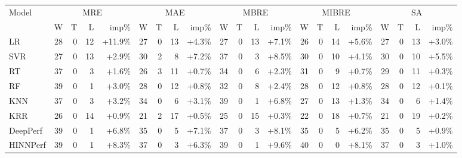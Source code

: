 \begin{tabular}{lrrrrrrrrrrrrrrrrrrrr}
\toprule
Model & \multicolumn{4}{c}{MRE} & \multicolumn{4}{c}{MAE} & \multicolumn{4}{c}{MBRE} & \multicolumn{4}{c}{MIBRE} & \multicolumn{4}{c}{SA} \\
& W & T & L & imp\% & W & T & L & imp\% & W & T & L & imp\% & W & T & L & imp\% & W & T & L & imp\% \\
\midrule
LR & 28 & 0 & 12 & +11.9\% & 27 & 0 & 13 & +4.3\% & 27 & 0 & 13 & +7.1\% & 26 & 0 & 14 & +5.6\% & 27 & 0 & 13 & +3.0\% \\
SVR & 27 & 0 & 13 & +2.9\% & 30 & 2 & 8 & +7.2\% & 37 & 0 & 3 & +8.5\% & 30 & 0 & 10 & +4.1\% & 30 & 0 & 10 & +5.5\% \\
RT & 37 & 0 & 3 & +1.6\% & 26 & 3 & 11 & +0.7\% & 34 & 0 & 6 & +2.3\% & 31 & 0 & 9 & +0.7\% & 29 & 0 & 11 & +0.3\% \\
RF & 39 & 0 & 1 & +3.0\% & 28 & 0 & 12 & +0.8\% & 32 & 0 & 8 & +2.4\% & 28 & 0 & 12 & +0.8\% & 28 & 0 & 12 & +0.1\% \\
KNN & 37 & 0 & 3 & +3.2\% & 34 & 0 & 6 & +3.1\% & 39 & 0 & 1 & +6.8\% & 27 & 0 & 13 & +1.3\% & 34 & 0 & 6 & +1.4\% \\
KRR & 26 & 0 & 14 & +0.9\% & 21 & 2 & 17 & +0.5\% & 25 & 0 & 15 & +0.3\% & 22 & 0 & 18 & +0.7\% & 21 & 0 & 19 & +0.2\% \\
DeepPerf & 39 & 0 & 1 & +6.8\% & 35 & 0 & 5 & +7.1\% & 37 & 0 & 3 & +8.1\% & 35 & 0 & 5 & +6.2\% & 35 & 0 & 5 & +0.9\% \\
HINNPerf & 39 & 0 & 1 & +8.3\% & 37 & 0 & 3 & +6.3\% & 39 & 0 & 1 & +9.6\% & 40 & 0 & 0 & +8.1\% & 37 & 0 & 3 & +1.0\% \\
\bottomrule
\end{tabular}
